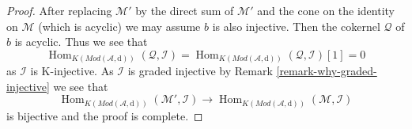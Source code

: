 \documentclass[10pt,a4paper]{amsart}
\theoremstyle{plain}
\theoremstyle{definition}
\theoremstyle{remark}
\numberwithin{equation}{subsection}
\def\Hom{\mathop{\mathrm{Hom}}\nolimits}
\begin{document}
\begin{proof}
After replacing $\mathcal{M}'$ by the direct sum of $\mathcal{M}'$
and the cone on the identity on $\mathcal{M}$ (which is acyclic)
we may assume $b$ is also injective. Then the cokernel $\mathcal{Q}$
of $b$ is acyclic. Thus we see that
$$
\Hom_{K(\textit{Mod}(\mathcal{A}, \text{d}))}(\mathcal{Q}, \mathcal{I}) =
\Hom_{K(\textit{Mod}(\mathcal{A}, \text{d}))}(\mathcal{Q}, \mathcal{I})[1] = 0
$$
as $\mathcal{I}$ is K-injective. As $\mathcal{I}$ is graded injective
by Remark \ref{remark-why-graded-injective}
we see that
$$
\Hom_{K(\textit{Mod}(\mathcal{A}, \text{d}))}(\mathcal{M}', \mathcal{I})
\longrightarrow
\Hom_{K(\textit{Mod}(\mathcal{A}, \text{d}))}(\mathcal{M}, \mathcal{I})
$$
is bijective and the proof is complete.
\end{proof}
\end{document}
